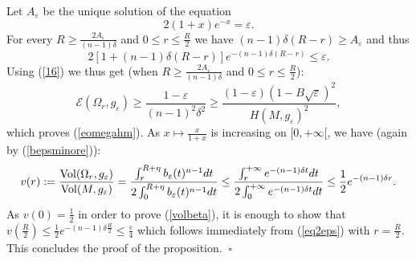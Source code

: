 \documentclass[11pt, reqno]{amsart}
\theoremstyle{plain}
\begin{document}
Let $A_{\varepsilon}$ be the unique solution of the equation 
$$2(1+x)e^{-x}=\varepsilon .$$
For every $R\geq \frac{2A_{\varepsilon}}{(n-1)\delta}$ and $0\leq r\leq \frac{R}{2}$ we have
$(n-1)\delta (R-r)\geq A_{\varepsilon}$ and thus
\begin{equation}\label{eq2eps}
2\left[1+(n-1)\delta(R-r)\right]e^{-(n-1)\delta (R-r)}\leq\varepsilon .
\end{equation}
Using (\ref{16}) we thus get (when $R\geq \frac{2A_{\varepsilon}}{(n-1)\delta}$ and $0\leq r\leq \frac{R}{2}$):
$${\mathcal E}(\Omega_r, g_{\varepsilon})\geq \frac{1-\varepsilon}{(n-1)^2\delta^2}\geq \frac{(1-\varepsilon )(1-B\sqrt{\varepsilon})^2}{H(M, g_{\varepsilon})^2},$$
which proves (\ref{eomegahm}).
As $x\mapsto \frac{x}{1+x}$ is increasing on $[0,+\infty [$, we have (again by (\ref{bepsminore})):
$$v(r):=\frac{{\rm Vol}(\Omega_r , g_{\varepsilon})}{{\rm Vol}(M, g_{\varepsilon})}=\frac{\int_r^{R+\eta}b_{\varepsilon}(t)^{n-1}dt}{2\int_0^{R+\eta}b_{\varepsilon}(t)^{n-1}dt}
\leq\frac{\int_r^{+\infty}e^{-(n-1)\delta t}dt}{2\int_0^{+\infty}e^{-(n-1)\delta t}dt}\leq \frac{1}{2} e^{-(n-1)\delta r}.$$
As $v(0)=\frac{1}{2}$ in order to prove (\ref{volbeta}), it is enough to show  that $v(\frac{R}{2})\leq\frac{1}{2}e^{-(n-1)\delta \frac{R}{2}}\leq\frac{\varepsilon}{4}$
which follows immediately from (\ref{eq2eps}) with $r=\frac{R}{2}$. This concludes the proof of the proposition.
$\ \square$
\end{document}
